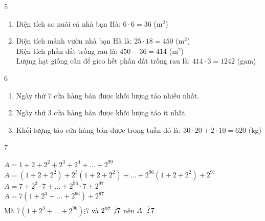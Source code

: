 \begin{Solbook}{5}
 \par \noindent  \begin {enumerate} \item Diện tích ao nuôi cá nhà bạn Hà: $6\cdot 6 = 36$ (m$^2$) \item Diện tích mảnh vườn nhà bạn Hà là: $25\cdot 18 = 450$ (m$^2$) \\ Diện tích phần đất trồng rau là: $450 - 36 = 414$ (m$^2$) \\ Lượng hạt giống cần để gieo hết phần đất trồng rau là: $414\cdot 3 = 1242$ (gam) \end {enumerate}  \hfill \qedEX 
\end{Solbook}
\begin{Solbook}{6}
 \par \noindent  \begin {enumerate} \item Ngày thứ 7 cửa hàng bán được khối lượng táo nhiều nhất. \item Ngày thứ 3 cửa hàng bán được khối lượng táo ít nhất. \item Khối lượng táo cửa hàng bán được trong tuần đó là: $30\cdot 20 + 2\cdot 10 = 620$ (kg) \end {enumerate}  \hfill \qedEX 
\end{Solbook}
\begin{Solbook}{7}
 \par \noindent  $A = 1+2+2^2+2^3+2^4+...+2^{99}$ \\$A = (1+2+2^2)+2^3(1+2+2^2)+...+2^{96}(1+2+2^2)+2^{97}$ \\ $A = 7 + 2^3\cdot 7+...+2^{96}\cdot 7+2^{97}$ \\ $A = 7(1+2^3+...+2^{96})+2^{97}$ \\Mà $7(1+2^3+...+2^{96})\vdots 7$ và $2^{97}\not \vdots 7$ nên $A\, \not \vdots \, 7$  \hfill \qedEX 
\end{Solbook}

